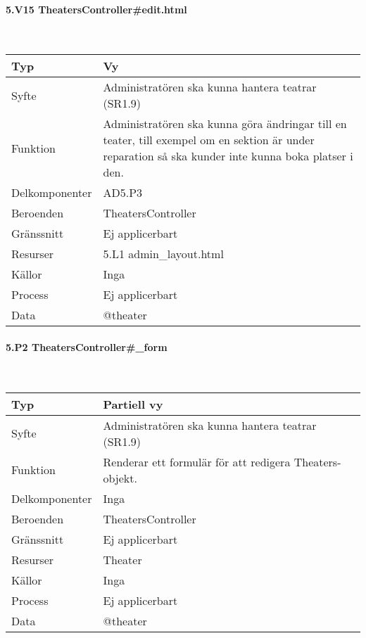 \documentclass[a4paper, twoside, 11pt, titlepage]{article}
\begin{document}
			\paragraph{5.V15 TheatersController\#edit.html}\

			\begin {table} [ht] \begin{tabular} {  p{3.5cm} p{9.6cm} }
				\hline
				{Typ} & {Vy} \\
				\hline
				{Syfte} & {Administratören ska kunna hantera teatrar (SR1.9)} \\
				\hline
				{Funktion} & {Administratören ska kunna göra ändringar till en teater, till exempel om en sektion är under reparation så ska kunder inte kunna boka platser i den.} \\
				\hline
				{Delkomponenter} & {AD5.P3} \\
				\hline
				{Beroenden} & {TheatersController} \\
				\hline
				{Gränssnitt} & {Ej applicerbart} \\
				\hline
				{Resurser} & {5.L1 admin\_layout.html} \\
				\hline
				{Källor} & {Inga} \\
				\hline
				{Process} & {Ej applicerbart} \\
				\hline
				{Data} & {@theater} \\
				\hline
			\end{tabular} \end{table} \FloatBarrier


			\paragraph{5.P2 TheatersController\#\_form}\

			\begin {table} [ht] \begin{tabular} {  p{3.5cm} p{9.6cm} }
				\hline
				{Typ} & {Partiell vy} \\
				\hline
				{Syfte} & {Administratören ska kunna hantera teatrar (SR1.9)} \\
				\hline
				{Funktion} & {Renderar ett formulär för att redigera Theaters-objekt.} \\
				\hline
				{Delkomponenter} & {Inga} \\
				\hline
				{Beroenden} & {TheatersController} \\
				\hline
				{Gränssnitt} & {Ej applicerbart} \\
				\hline
				{Resurser} & {Theater} \\
				\hline
				{Källor} & {Inga} \\
				\hline
				{Process} & {Ej applicerbart} \\
				\hline
				{Data} & {@theater} \\
				\hline
			\end{tabular} \end{table} \FloatBarrier
\end{document}
